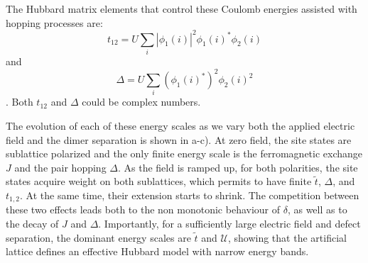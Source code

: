 The Hubbard matrix elements that control these Coulomb energies assisted with hopping processes are: 
$$t_{12}= U \sum_i |\phi_{1}(i)|^2 \phi_1(i)^* \phi_{2}(i)$$
and
$$\Delta= U \sum_i (\phi_{1}(i)^*)^2 \phi_2(i)^2$$.
Both $t_{12}$ and $\Delta$ could be complex numbers.

The evolution of each of these energy scales as we vary both the applied electric field and the dimer separation is shown in a-c). At zero field, the site states are sublattice polarized and the only finite energy scale is the ferromagnetic exchange $J$ and the pair hopping $\Delta$. As the field is ramped up, for both polarities, the site states acquire weight on both sublattices, which permits to have finite $\tilde{t}$, $\Delta$, and $t_{1,2}$. At the same time, their extension starts to shrink. The competition between these two effects leads both to the non monotonic behaviour of $\delta$, as well as to the decay of $J$ and $\Delta$. Importantly, for a sufficiently large electric field and defect separation, the dominant energy scales are $\tilde{t}$ and $\mathcal{U}$, showing that the artificial lattice defines an effective Hubbard model with narrow energy bands. 


